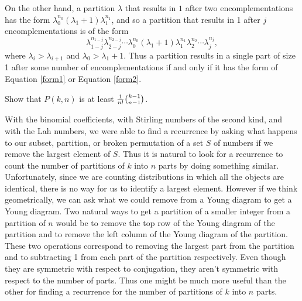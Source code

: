 {{On the other hand, a partition $\lambda$ that results in $1$ after
two encomplementations has the form
$\lambda_0^{n_0}(\lambda_1+1)\lambda_1^{n_1}$, and so a partition that
results in 1 after $j$ encomplementations is of the form
  \begin{equation}
\lambda_{1-j}^{n_{1-j}}\lambda_{2-j}^{n_{2-j}}\cdots
\lambda_0^{n_0}(\lambda_1+1)\lambda_1^{n_1}\lambda_2^{n_2}\cdots
\lambda_j^{n_j},\label{form2}
  \end{equation} 
where $\lambda_i>\lambda_{i+1}$ and $\lambda_0>\lambda_1+1$.  Thus a
partition results in a single part of size 1 after some number of
encomplementations if and only if it has the form of Equation
\ref{form1} or Equation \ref{form2}.}



\item Show that $P(k,n)$ is at least ${1\over n!}{k-1\choose n-1}$.
\ep

 With the binomial coefficients, with Stirling numbers of the
 second kind, and with the Lah numbers, we were able to find a
recurrence by asking what happens to our subset, partition, or broken
permutation of a set $S$ of numbers if we remove the largest element of
$S$.  Thus it is natural to look for a recurrence to count the number of
partitions of $k$ into $n$ parts by doing something similar. 
Unfortunately, since we are counting distributions in which all the
objects are identical, there is no way for us to identify a largest
element. However if we think geometrically, we can ask what we could
remove from a Young diagram to get a Young diagram. Two natural ways to
get a partition of a smaller integer from a partition of
$n$ would be to remove the top row of the Young diagram of the partition
and to remove the left column of the Young diagram of the partition. 
These two operations correspond to removing the largest part from the
partition and to subtracting 1 from each part of the partition
respectively.  Even though they are symmetric with respect to
conjugation, they aren't symmetric with respect to the number of parts. 
Thus one might be much more useful than the other for finding a recurrence
for the number of partitions of
$k$ into $n$ parts.

}
